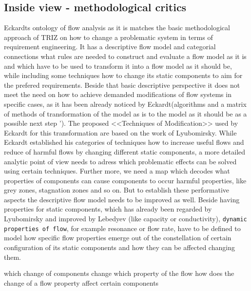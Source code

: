 \documentclass[a4paper,11pt]{article}
\begin{document}
\begin{itemize}
        \subsection{Inside view - methodological critics}
        Eckardts ontology of flow analysis as it is matches the basic methodological approach of TRIZ on how to change a problematic system in terms 
        of requirement engineering. It has a descriptive flow model and categorial connections what rules are needed to construct and evaluate a 
        flow model as it is and which have to be used to transform it into a flow model as it should be, while including some techniques how to change
        its static components to aim for the prefered requirements. Beside that basic descriptive perspective it does not meet the need on how
        to achieve demanded modifications of flow systems in specific cases, as it has been already noticed by Eckardt(algorithms and a matrix
        of methods of transformation of the model as is to the model as it should be as a possible next step \cite{Eckardt2020}').
        The proposed <<Techniques of Modification>> used by Eckardt for this transformation are based on the work of Lyubomirsky. While Eckardt established
        his categories of techniques how to increase useful flows and reduce of harmful flows by changing different static components, a more detailed analytic 
        point of view needs to adress which problematic effects can be solved using certain techniques. Further more, we need a map which decodes what
        properties of components can cause components to occur harmful properties, like grey zones, stagnation zones and so on. 
        But to establish these performative aspects the descriptive flow model needs to be improved as well. 
        Beside having properties for static components, which has already been regarded by Lyubomirsky and improved by Lebedyev (like capacity or conductivity),
        \texttt{dynamic properties of flow}, for example resonance or flow rate, have to be
        defined to model how specific flow properties emerge out of the constellation of certain configuration of its static components and how they can be affected
        changing them.

        which change of components change which property of the flow
        how does the change of a flow property affect certain components
        

\end{itemize}
\end{document}
